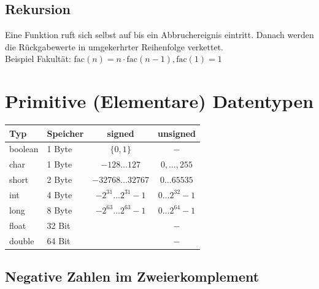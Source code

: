 \documentclass[fs, footer]{latex4ei}
\begin{document}
\begin{multicols*}{4}
	\subsection{Rekursion}
	Eine Funktion ruft sich selbst auf bis ein Abbruchereignis eintritt. Danach werden die Rückgabewerte in umgekerhrter Reihenfolge verkettet.\\
	Beispiel Fakultät: $\text{fac}(n) = n \cdot \text{fac}(n-1), \text{fac}(1)=1$\\

\iffalse
\section{Primitive (Elementare) Datentypen}
\begin{tabular}{llcc}
		Typ & Speicher & signed & unsigned \\ \hline
		boolean & 1 Byte & $\{0,1\}$ & $-$ \\
		char & 1 Byte & $-128 \ldots 127$ & $0,\ldots ,255$ \\
		short & 2 Byte & $-32768 \ldots 32767$ & $0 \ldots 65535$\\		
		int & 4 Byte & $-2^{31} \ldots 2^{31}-1$ & $0 \ldots 2^{32}-1$\\ 
		long & 8 Byte & $-2^{63} \ldots 2^{63}-1$ & $0 \ldots 2^{64}-1$\\	
		float & 32 Bit & & $-$\\
		double & 64 Bit & & $-$\\
\end{tabular}
	\subsection{Negative Zahlen im Zweierkomplement}
	

\end{multicols*}
\end{document}
